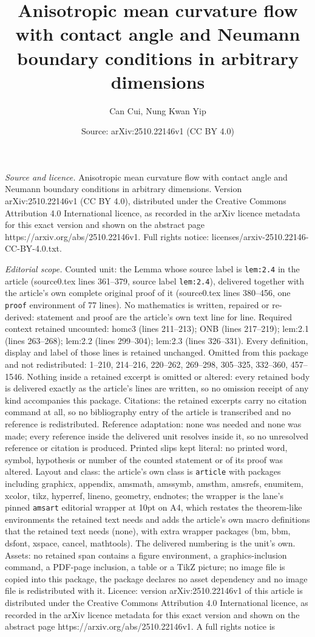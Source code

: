 \documentclass[10pt,a4paper]{amsart}
\title[Anisotropic mean curvature flow with contact angle and Neuma]{Anisotropic mean curvature flow with contact angle and Neumann boundary conditions in arbitrary dimensions}
\author{Can Cui, Nung Kwan Yip}
\date{Source: arXiv:2510.22146v1 (CC BY 4.0)}
\begin{document}
\maketitle

\noindent\emph{Source and licence.} Anisotropic mean curvature flow with contact angle and Neumann boundary conditions in arbitrary dimensions. Version arXiv:2510.22146v1 (CC BY 4.0), distributed under the Creative Commons Attribution 4.0 International licence, as recorded in the arXiv licence metadata for this exact version and shown on the abstract page https://arxiv.org/abs/2510.22146v1. Full rights notice: licenses/arxiv-2510.22146-CC-BY-4.0.txt.\par\smallskip

\noindent\textit{Editorial scope.} Counted unit: the Lemma whose source label is \texttt{lem:2.4} in the article (source0.tex lines 361--379, source label \texttt{lem:2.4}), delivered together with the article's own complete original proof of it (source0.tex lines 380--456, one \texttt{proof} environment of 77 lines). No mathematics is written, repaired or re-derived: statement and proof are the article's own text line for line. Required context retained uncounted: homc3 (lines 211--213); ONB (lines 217--219); lem:2.1 (lines 263--268); lem:2.2 (lines 299--304); lem:2.3 (lines 326--331). Every definition, display and label of those lines is retained unchanged. Omitted from this package and not redistributed: 1--210, 214--216, 220--262, 269--298, 305--325, 332--360, 457--1546. Nothing inside a retained excerpt is omitted or altered: every retained body is delivered exactly as the article's lines are written, so no omission receipt of any kind accompanies this package. Citations: the retained excerpts carry no citation command at all, so no bibliography entry of the article is transcribed and no reference is redistributed. Reference adaptation: none was needed and none was made; every reference inside the delivered unit resolves inside it, so no unresolved reference or citation is produced. Printed slips kept literal: no printed word, symbol, hypothesis or number of the counted statement or of its proof was altered. Layout and class: the article's own class is \texttt{article} with packages including graphicx, appendix, amsmath, amssymb, amsthm, amsrefs, enumitem, xcolor, tikz, hyperref, lineno, geometry, endnotes; the wrapper is the lane's pinned \texttt{amsart} editorial wrapper at 10pt on A4, which restates the theorem-like environments the retained text needs and adds the article's own macro definitions that the retained text needs (none), with extra wrapper packages (bm, bbm, dsfont, xspace, cancel, mathtools). The delivered numbering is the unit's own. Assets: no retained span contains a figure environment, a graphics-inclusion command, a PDF-page inclusion, a table or a TikZ picture; no image file is copied into this package, the package declares no asset dependency and no image file is redistributed with it. Licence: version arXiv:2510.22146v1 of this article is distributed under the Creative Commons Attribution 4.0 International licence, as recorded in the arXiv licence metadata for this exact version and shown on the abstract page https://arxiv.org/abs/2510.22146v1. A full rights notice is 
\end{document}
